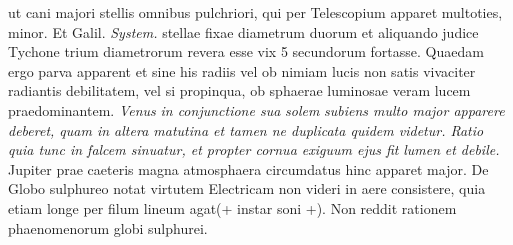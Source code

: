 ut cani majori stellis omnibus  pulchriori, qui per Telescopium\protect{} apparet  multoties, minor. Et Galil. \textit{System.}   stellae fixae\protect{}  diametrum duorum  et aliquando judice Tychone\protect{} trium diametrorum revera esse vix 5 secundorum  fortasse. Quaedam ergo parva apparent et sine his radiis vel ob nimiam lucis\protect{} non satis vivaciter radiantis  debilitatem, vel si propinqua, ob sphaerae luminosae\protect{} veram lucem\protect{}  praedominantem. \textit{Venus}\protect{}\textit{ in conjunctione  sua }\textit{ }\textit{solem}\protect{}\textit{ subiens multo major apparere deberet, quam in altera matutina et tamen ne duplicata quidem  videtur. Ratio quia tunc in falcem sinuatur, et propter cornua exiguum  ejus fit }\textit{lumen}\protect{}\textit{ et debile.} Jupiter\protect{} prae  caeteris magna atmosphaera\protect{} circumdatus  hinc apparet major.\pend \pstart {} De Globo sulphureo\protect{}  notat virtutem Electricam\protect{} non  videri in aere consistere, quia etiam longe  per filum lineum agat\linebreak (+ instar soni +).  Non reddit rationem phaenomenorum globi 
 sulphurei\protect{}.\pend 
